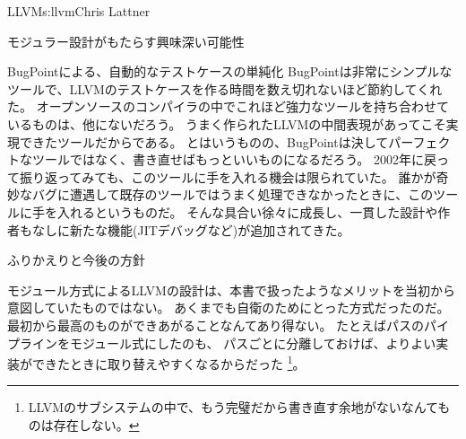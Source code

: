 \begin{aosachapter}{LLVM}{s:llvm}{Chris Lattner}
\begin{aosasect1}{モジュラー設計がもたらす興味深い可能性}
\begin{aosasect2}{BugPointによる、自動的なテストケースの単純化}
BugPointは非常にシンプルなツールで、LLVMのテストケースを作る時間を数え切れないほど節約してくれた。
オープンソースのコンパイラの中でこれほど強力なツールを持ち合わせているものは、他にないだろう。
うまく作られたLLVMの中間表現があってこそ実現できたツールだからである。
とはいうものの、BugPointは決してパーフェクトなツールではなく、書き直せばもっといいものになるだろう。
2002年に戻って振り返ってみても、このツールに手を入れる機会は限られていた。
誰かが奇妙なバグに遭遇して既存のツールではうまく処理できなかったときに、このツールに手を入れるというものだ。
そんな具合い徐々に成長し、一貫した設計や作者もなしに新たな機能(JITデバッグなど)が追加されてきた。

\end{aosasect2}

\end{aosasect1}

\begin{aosasect1}{ふりかえりと今後の方針}

モジュール方式によるLLVMの設計は、本書で扱ったようなメリットを当初から意図していたものではない。
あくまでも自衛のためにとった方式だったのだ。
最初から最高のものができあがることなんてあり得ない。
たとえばパスのパイプラインをモジュール式にしたのも、
パスごとに分離しておけば、よりよい実装ができたときに取り替えやすくなるからだった
\footnote{LLVMのサブシステムの中で、もう完璧だから書き直す余地がないなんてものは存在しない。}。


\end{aosasect1}
\end{aosachapter}
